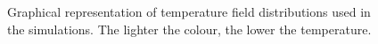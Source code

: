 \begin{figure}[t]
\begin{subfigure}[b]{0.2\textwidth}
      \caption{}
      \label{fig:non-convex}
  \end{subfigure}
  \caption[Graphical representation of temperature field distributions used in the simulations.]{Graphical representation of temperature field distributions used in the simulations. 
  The lighter the colour, the lower the temperature. }
  \label{fig:field-phenomena-distribution}
\end{figure}